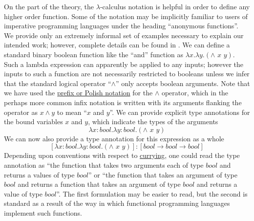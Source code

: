 On the part of the theory, the $\lambda$-calculus notation is helpful in
order to define any higher order function. Some of the notation may be
implicitly familiar to users of imperative programming languages under
the heading ``anonymous functions''. We provide only an extremely
informal set of examples necessary to explain our intended work;
however, complete details can be found in \cite{Barendregt1985}. We can define a
standard binary boolean function like the ``and'' function as $\lambda x. \lambda y.(\wedge\,\,x\,\,y)$. Such a lambda expression can apparently be applied to any inputs;
however the inputs to such a function are not necessarily restricted to
booleans unless we infer that the standard logical operator
``$\wedge$'' only accepts boolean arguments.
Note that we have used the
\href{http://en.wikipedia.org/wiki/Polish\_notation}{prefix or Polish
notation} for the $\wedge$ operator, which
in the perhaps more common infix notation is written with its arguments
flanking the operator as $x \wedge y$ to mean
``$x$ and
$y$''. We can provide explicit type
annotations for the bound variables $x$
and $y$, which indicate the types of
the arguments
\begin{equation}\label{eq:booltype}
\lambda x:bool. \lambda y:bool.(\wedge\,\,x\,\,y)
\end{equation}
We can now also provide a type annotation for this expression as a whole
\begin{equation}\label{eq:boolfulltype}
[\lambda x:bool. \lambda y:bool.(\wedge\,\,x\,\,y)]:[bool \rightarrow bool \rightarrow bool]
\end{equation}
Depending upon conventions with respect to
\href{http://en.wikipedia.org/wiki/Currying}{currying}, one could read
the type annotation as ``the function that takes two arguments each of
type $bool$ and returns a values of type
$bool$'' or ``the function that takes an
argument of type $bool$ and returns a
function that takes an argument of type
$bool$ and returns a value of type
$bool$''. The first formulation may be
easier to read, but the second is standard as a result of the way in
which functional programming languages implement such functions.

